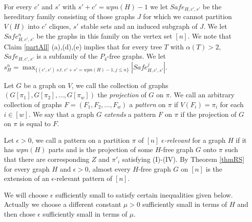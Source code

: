 \documentclass[12pt]{article}
\theoremstyle{definition}
\begin{document}
For every $c'$ and $s'$ with $s'+c'=wpn(H)-1$ we let $Safe_{H,c',s'}$ be the hereditary family 
consisting of those graphs $J$ for which we cannot partition $V(H)$ into $c'$ cliques, $s'$ stable sets 
and an induced  subgraph of $J$.  We let  $Safe^n_{H,c',s'}$ be the graphs in this family on the vertex set $[n]$.
We note that  Claim \ref{partAll} (a),(d),(e) 
implies  that for every tree $T$ with  $\alpha(T)>2$, 
$Safe_{H,c',s'}$ is a subfamily  of the $P_4$-free graphs. 
We let $s^n_H=\max_{\{(c',s')~ s.t. ~c'+s'=wpn(H)-1,j \le n\}} |Safe^j_{H,c',s'}|$. 



 Let $G$ be a graph on $V$, we call the collection of graphs $(G[\pi_1],G[\pi_2],\ldots,G[\pi_w])$ the {\it projection} of $G$ on $\pi$. We call an arbitrary collection of graphs $F=(F_1,F_2,\ldots,F_w)$ a {\it pattern} on $\pi$ if $V(F_i)=\pi_i$ for each $i\in[w]$. We say that a graph $G$  {\it extends} a pattern $F$ on $\pi$ if the projection of $G$ on $\pi$ is equal to $F$.

Let $\epsilon>0$, we call a pattern on a partition $\pi$ of $[n]$ {\it $\epsilon$-relevant} for a graph $H$ 
if it has $wpn(H)$ parts and is the projection of some $H$-free graph $G$  onto  $\pi$   such that there are corresponding  $Z$ and $\pi'_i$ satisfying (I)-(IV). 
By Theorem \ref{thmRS} for every graph $H$ and  $\epsilon>0$,  almost every $H$-free graph $G$ on $[n]$ 
is the extension of an 
$\epsilon$-relevant pattern of $[n]$. 


We will choose $\epsilon$ sufficiently small to 
satisfy certain inequalities given below.  Actually we choose a different constant $\mu>0$ sufficiently 
small in terms of $H$ and then chose $\epsilon$ sufficiently small in terms of $\mu$. 
\end{document}
